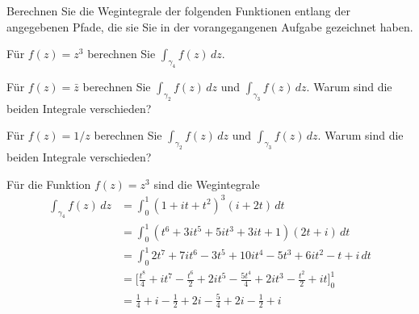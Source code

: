 Berechnen Sie die Wegintegrale der folgenden Funktionen entlang der
angegebenen Pfade, die sie Sie in der vorangegangenen Aufgabe gezeichnet
haben.
\begin{teilaufgaben}
\item Für $f(z) = z^3$ berechnen Sie $\int_{\gamma_4}f(z)\,dz$.
\item Für $f(z) = \bar{z}$ berechnen Sie $\int_{\gamma_2}f(z)\,dz$ und
$\int_{\gamma_3}f(z)\,dz$.
Warum sind die beiden Integrale verschieden?
\item Für $f(z) = 1/z$ berechnen Sie $\int_{\gamma_2}f(z)\,dz$ und
$\int_{\gamma_3}f(z)\,dz$.
Warum sind die beiden Integrale verschieden?
\end{teilaufgaben}

\begin{loesung}
\begin{teilaufgaben}
\item Für die Funktion $f(z) = z^3$ sind die Wegintegrale
\begin{align*}
\int_{\gamma_4} f(z)\,dz
&=
\int_0^1 
(1+it+t^2)^3 (i+2t)
\,dt
\\
&=
\int_0^1 
(t^6+3it^5+5it^3+3it+1)(2t+i)
\,dt
\\
&=
\int_0^1 
2t^7+7it^6-3t^5+10it^4-5t^3+6it^2-t+i
\,dt
\\
&=
\biggl[
\frac{t^8}{4}+it^7-\frac{t^6}{2}+2it^5-\frac{5t^4}{4}+2it^3-\frac{t^2}{2}+it
\biggr]_0^1
\\
&=
\frac14+i-\frac12+2i-\frac54+2i-\frac12+i

\end{align*}
\end{teilaufgaben}
\end{loesung}
